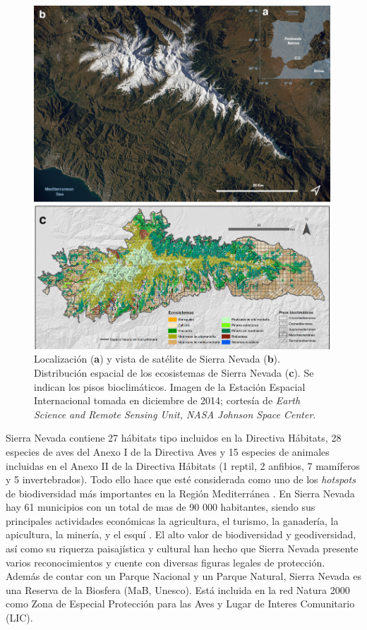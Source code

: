 \begin{figure}
	\centering
	\includegraphics[width=0.99\textwidth]{img/metodologia/metodologia-mapasn.jpg}
	\caption{Localización (\textbf{a}) y vista de satélite de Sierra Nevada (\textbf{b}). Distribución espacial de los ecosistemas de Sierra Nevada  (\textbf{c}). Se indican los pisos bioclimáticos. Imagen de la Estación Espacial Internacional tomada en diciembre de 2014; cortesía de \emph{Earth Science and Remote Sensing Unit, NASA Johnson Space Center}.}\label{fig:metodologia:mapa-sn}
\end{figure}


Sierra Nevada contiene 27 hábitats tipo incluidos en la Directiva Hábitats, 28 especies de aves del Anexo I de la Directiva Aves y 15 especies de animales incluidas en el Anexo II de la Directiva Hábitats (1 reptil, 2 anfibios, 7 mamíferos y 5 invertebrados). Todo ello hace que esté considerada como uno de los \emph{hotspots} de biodiversidad más importantes en la Región Mediterránea \autocites{Blanca1996ProteccionFlora,Blancaetal1998ThreatenedVascular,MedailQuezel1999BiodiversityHotspots,Canadasetal2014HotspotsHotspots}. En Sierra Nevada hay 61 municipios con un total de mas de 90 000 habitantes, siendo sus principales actividades económicas la agricultura, el turismo, la ganadería, la apicultura, la minería, y el esquí \autocite{FernandezMarquezSalinas2009ImpactoSocioeconomico}. El alto valor de biodiversidad y geodiversidad, así como su riquerza paisajística y cultural han hecho que Sierra Nevada presente varios reconocimientos y cuente con diversas figuras legales de protección. Además de contar con un Parque Nacional y un Parque Natural, Sierra Nevada es una Reserva de la Biosfera (MaB, Unesco). Está incluida en la red Natura 2000 como Zona de Especial Protección para las Aves y Lugar de Interes Comunitario (LIC). 

